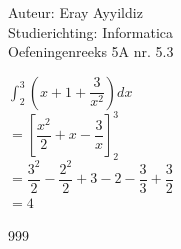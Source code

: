 \documentclass[a4paper]{article}
\begin{document}
  
\noindent \large Auteur: Eray Ayyildiz \\
\noindent \large Studierichting: Informatica\\
\noindent \large Oefeningenreeks 5A nr. 5.3\\

\medskip

\normalsize
 
$\displaystyle\int_{2}^{3}  \left( x+1+\dfrac{3}{x^2}\right) dx$\\

$= \left[\dfrac{x^2}{2} +x - \dfrac{3}{x}\right]_{2}^{3}$\\

$= \dfrac{3^2}{2}-\dfrac{2^2}{2} + 3 - 2 -\dfrac{3}{3} + \dfrac{3}{2}$\\

$=4$\\






\begin{thebibliography}{999}
\end{thebibliography}
\end{document}
